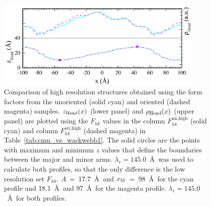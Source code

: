 \begin{figure}[htbp]
  \centering
  \includegraphics[width=0.9\textwidth]{figures/ripple/LAXS/un_vs_ori}
  \caption[Comparison of high resolution structures obtained using the form factors from
  the unoriented (solid cyan) and oriented (dashed magenta) samples]
  {Comparison of high resolution structures obtained using the form factors from
  the unoriented (solid cyan) and oriented (dashed magenta) samples.
  $z_\text{Head}(x)$ (lower panel) and $\rho_\text{Head}(x)$ (upper panel) are plotted using the $F_{hk}$ values in the column 
  $F_{hk}^\text{un,high}$ (solid cyan) and column $F_{hk}^\text{ori,high}$ (dashed magenta)
  in Table~\ref{tab:cmu_vs_wackwebb1}.
  The solid circles are the points with maximum and minimum $z$ values that 
  define the boundaries between the major and minor arms. 
  $\lambda_r=145.0$~\AA\ was used to calculate both profiles, so that the only difference 
  is the low resolution set $F_{hk}$.
  $A$~=~17.7~\AA\ and $x_\textrm{M}$~=~98~\AA\ for the cyan profile and 18.1~\AA\ and 97~\AA\
  for the magenta profile. $\lambda_r=145.0$~\AA\ for both profiles.}
  \label{fig:un_vs_ori}
\end{figure}

